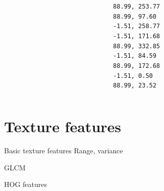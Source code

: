 \documentclass[9pt, aspectratio=169]{beamer}
\begin{document}
\begin{frame}
{\begin{columns}
\begin{column}{.7\textwidth}
            \end{column}
            \begin{column}{.23\textwidth}
                \begin{codebox}
                    \texttt{88.99, 253.77\\
                        88.99, 97.60\\
                        -1.51, 258.77\\
                        -1.51, 171.68\\
                        88.99, 332.85\\
                        -1.51, 84.59\\
                        88.99, 172.68\\
                        -1.51, 0.50\\
                        88.99, 23.52
                    }
                \end{codebox}
            \end{column}
        \end{columns}

    }
\end{frame}

\section{Texture features}

\begin{frame}
    {Basic texture features}
    Range, variance
\end{frame}

\begin{frame}
    {GLCM}
\end{frame}

\begin{frame}
    {HOG features}
\end{frame}
\end{document}
